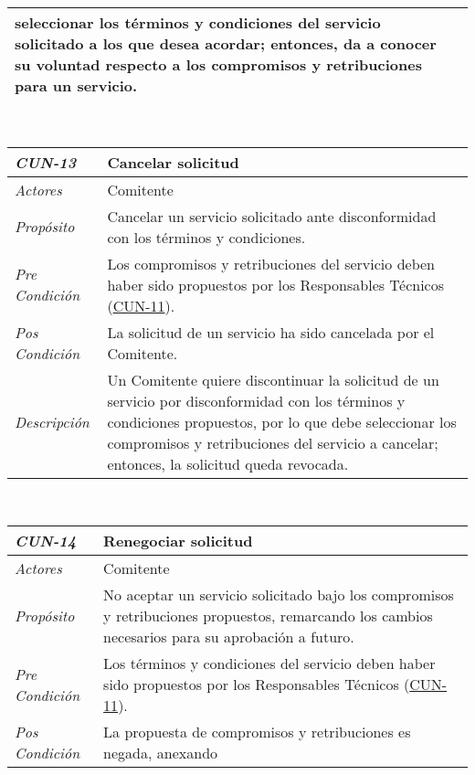 \begin{center}
{\begin{tabular}{ | p{3cm} | p{12.5cm} | }
	seleccionar los t\'erminos y condiciones del
	servicio solicitado a los que desea acordar; entonces,
	da a conocer su voluntad respecto a los compromisos
	y retribuciones para un servicio. \\
	\hline
\end{tabular}} \\[1cm]
\hypertarget{CUN-13}{%
\begin{tabular}{ | p{3cm} | p{12.5cm} | }
	\hline
	\rowcolor{lightgray}
	\hfil \textbf{\textit{CUN-13}} &
	\hfil \textbf{Cancelar solicitud} \\
	\hline
	\raggedleft \textit{Actores} & Comitente \\
	\hline
	\raggedleft \textit{Prop\'osito} & Cancelar un servicio
	solicitado ante disconformidad con los t\'erminos y
	condiciones. \\
	\hline
	\raggedleft \textit{Pre Condici\'on} & Los compromisos
	y retribuciones del servicio deben haber sido
	propuestos por los Responsables T\'ecnicos
	(\hyperlink{CUN-11}{CUN-11}). \\
	\hline
	\raggedleft \textit{Pos Condici\'on} & La solicitud
	de un servicio ha sido cancelada por el Comitente. \\
	\hline
	\raggedleft \textit{Descripci\'on} &
	Un Comitente quiere discontinuar la solicitud de un
	servicio por disconformidad con los t\'erminos y
	condiciones propuestos, por lo que debe seleccionar los
	compromisos y retribuciones del servicio a cancelar;
	entonces, la solicitud queda revocada. \\
	\hline
\end{tabular}} \\[1cm]
\hypertarget{CUN-14}{%
\begin{tabular}{ | p{3cm} | p{12.5cm} | }
	\hline
	\rowcolor{lightgray}
	\hfil \textbf{\textit{CUN-14}} &
	\hfil \textbf{Renegociar solicitud} \\
	\hline
	\raggedleft \textit{Actores} & Comitente \\
	\hline
	\raggedleft \textit{Prop\'osito} & No aceptar un servicio
	solicitado bajo los compromisos y retribuciones
	propuestos, remarcando los cambios necesarios para su
	aprobaci\'on a futuro. \\
	\hline
	\raggedleft \textit{Pre Condici\'on} & Los t\'erminos
	y condiciones del servicio deben haber sido
	propuestos por los Responsables T\'ecnicos
	(\hyperlink{CUN-11}{CUN-11}). \\
	\hline
	\raggedleft \textit{Pos Condici\'on} & La propuesta
	de compromisos y retribuciones es negada, anexando

\end{tabular}}
\end{center}
